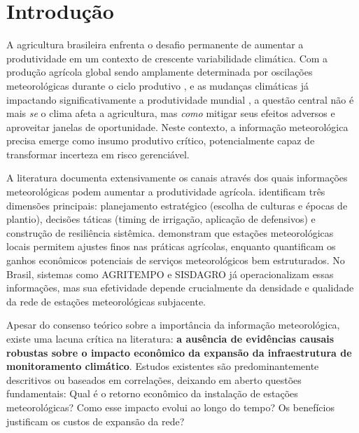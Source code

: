 \documentclass[
	12pt,				%
	oneside,			%
	a4paper,			%
	english,			%
	french,				%
	spanish,			%
	brazil				%
	]{abntex2}
\begin{document}
\chapter{Introdução}
\label{cap:introducao}

A agricultura brasileira enfrenta o desafio permanente de aumentar a produtividade em um contexto de crescente variabilidade climática. Com a produção agrícola global sendo amplamente determinada por oscilações meteorológicas durante o ciclo produtivo \cite{monteiro2009}, e as mudanças climáticas já impactando significativamente a produtividade mundial \cite{ortiz2020}, a questão central não é mais \textit{se} o clima afeta a agricultura, mas \textit{como} mitigar seus efeitos adversos e aproveitar janelas de oportunidade. Neste contexto, a informação meteorológica precisa emerge como insumo produtivo crítico, potencialmente capaz de transformar incerteza em risco gerenciável.

A literatura documenta extensivamente os canais através dos quais informações meteorológicas podem aumentar a produtividade agrícola.  identificam três dimensões principais: planejamento estratégico (escolha de culturas e épocas de plantio), decisões táticas (timing de irrigação, aplicação de defensivos) e construção de resiliência sistêmica.  demonstram que estações meteorológicas locais permitem ajustes finos nas práticas agrícolas, enquanto  quantificam os ganhos econômicos potenciais de serviços meteorológicos bem estruturados. No Brasil, sistemas como AGRITEMPO e SISDAGRO já operacionalizam essas informações, mas sua efetividade depende crucialmente da densidade e qualidade da rede de estações meteorológicas subjacente.

Apesar do consenso teórico sobre a importância da informação meteorológica, existe uma lacuna crítica na literatura: \textbf{a ausência de evidências causais robustas sobre o impacto econômico da expansão da infraestrutura de monitoramento climático}. Estudos existentes são predominantemente descritivos ou baseados em correlações, deixando em aberto questões fundamentais: Qual é o retorno econômico da instalação de estações meteorológicas? Como esse impacto evolui ao longo do tempo? Os benefícios justificam os custos de expansão da rede?
\end{document}
